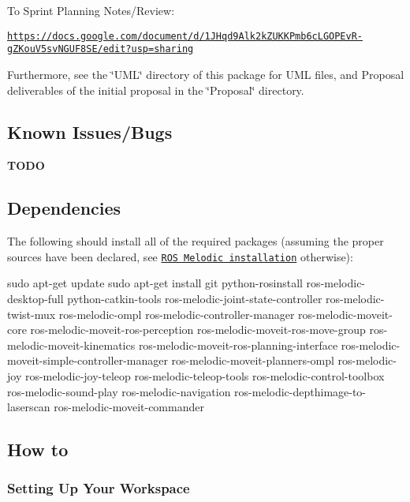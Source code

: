 To Sprint Planning Notes/\+Review\+:

\href{https://docs.google.com/document/d/1JHqd9Alk2kZUKKPmb6cLGOPEvR-gZKouV5svNGUF8SE/edit?usp=sharing}{\tt https\+://docs.\+google.\+com/document/d/1\+J\+Hqd9\+Alk2k\+Z\+U\+K\+K\+Pmb6c\+L\+G\+O\+P\+Ev\+R-\/g\+Z\+Kou\+V5sv\+N\+G\+U\+F8\+S\+E/edit?usp=sharing}

Furthermore, see the \char`\"{}\+U\+M\+L\char`\"{} directory of this package for U\+ML files, and Proposal deliverables of the initial proposal in the \char`\"{}\+Proposal\char`\"{} directory.

\subsection*{Known Issues/\+Bugs}

{\bfseries T\+O\+DO}

\subsection*{Dependencies}

The following should install all of the required packages (assuming the proper sources have been declared, see \href{http://wiki.ros.org/melodic/Installation/Ubuntu}{\tt R\+OS Melodic installation} otherwise)\+: 
\begin{DoxyCode}
sudo apt-get update
sudo apt-get install git python-rosinstall ros-melodic-desktop-full python-catkin-tools
       ros-melodic-joint-state-controller ros-melodic-twist-mux ros-melodic-ompl ros-melodic-controller-manager
       ros-melodic-moveit-core ros-melodic-moveit-ros-perception ros-melodic-moveit-ros-move-group ros-melodic-moveit-kinematics
       ros-melodic-moveit-ros-planning-interface ros-melodic-moveit-simple-controller-manager
       ros-melodic-moveit-planners-ompl ros-melodic-joy ros-melodic-joy-teleop ros-melodic-teleop-tools ros-melodic-control-toolbox
       ros-melodic-sound-play ros-melodic-navigation ros-melodic-depthimage-to-laserscan ros-melodic-moveit-commander
\end{DoxyCode}


\subsection*{How to}

\subsubsection*{Setting Up Your Workspace}


